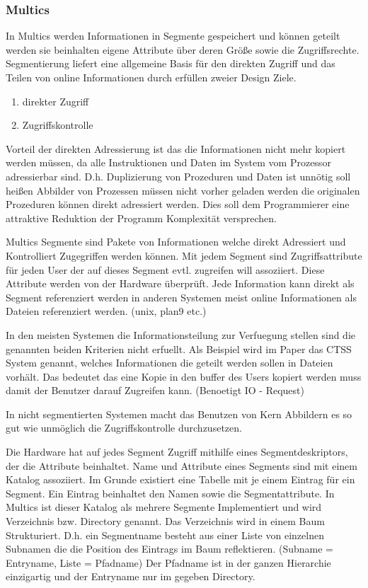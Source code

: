 \documentclass[german, 9pt,technote]{IEEEtran}
\begin{document}
      \subsubsection{Multics}  
        In Multics werden Informationen in Segmente gespeichert und k\"onnen geteilt 
				werden sie beinhalten eigene Attribute \"uber deren Gr\"o\ss e sowie die Zugriffsrechte.
				Segmentierung liefert eine allgemeine Basis f\"ur den direkten Zugriff und das Teilen von online Informationen durch erf\"ullen zweier Design Ziele.
		    \begin{enumerate}
		      \item direkter Zugriff
		      \item Zugriffskontrolle
        \end{enumerate}
		    Vorteil der direkten Adressierung ist das die Informationen nicht mehr kopiert werden m\"ussen, da alle Instruktionen und Daten
		    im System vom Prozessor adressierbar sind. D.h. Duplizierung von Prozeduren und Daten ist unn\"otig soll hei\ss en Abbilder von Prozessen m\"ussen
		    nicht vorher geladen werden die originalen Prozeduren k\"onnen direkt adressiert werden.
		    Dies soll dem Programmierer eine attraktive Reduktion der Programm Komplexit\"at versprechen.
		  
		    Multics Segmente sind Pakete von Informationen welche direkt Adressiert und Kontrolliert Zugegriffen werden k\"onnen.
		    Mit jedem Segment sind Zugriffsattribute f\"ur jeden User der auf dieses Segment evtl. zugreifen will assoziiert.
		    Diese Attribute werden von der Hardware \"uberpr\"uft. Jede Information kann direkt als Segment referenziert werden
		    in anderen Systemen meist online Informationen als Dateien referenziert werden. (unix, plan9 etc.)
		  
		    In den meisten Systemen die Informationsteilung zur Verfuegung stellen sind die genannten beiden Kriterien nicht erfuellt.
		    Als Beispiel wird im Paper \cite{inproc:multics} das CTSS System genannt, welches Informationen die geteilt werden sollen in Dateien vorh\"alt.
		    Das bedeutet das eine Kopie in den buffer des Users kopiert werden muss damit der Benutzer darauf Zugreifen kann. (Benoetigt IO - Request)
		  
		    In nicht segmentierten Systemen macht das Benutzen von Kern Abbildern es so gut wie unm\"oglich die Zugriffskontrolle durchzusetzen.
		  
        Die Hardware hat auf jedes Segment Zugriff mithilfe eines Segmentdeskriptors, der die Attribute beinhaltet.
		    Name und Attribute eines Segments sind mit einem Katalog assoziiert. Im Grunde existiert eine Tabelle mit je einem Eintrag f\"ur ein Segment. 
		    Ein Eintrag beinhaltet den Namen sowie die Segmentattribute. In Multics ist dieser Katalog als mehrere
		    Segmente Implementiert und wird Verzeichnis bzw. Directory genannt. Das Verzeichnis wird in einem Baum Strukturiert.
		    D.h. ein Segmentname besteht aus einer Liste von einzelnen Subnamen die die Position des Eintrags im Baum reflektieren.
		    (Subname = Entryname, Liste = Pfadname)
		    Der Pfadname ist in der ganzen Hierarchie einzigartig und der Entryname nur im gegeben Directory.
		     
\end{document}
